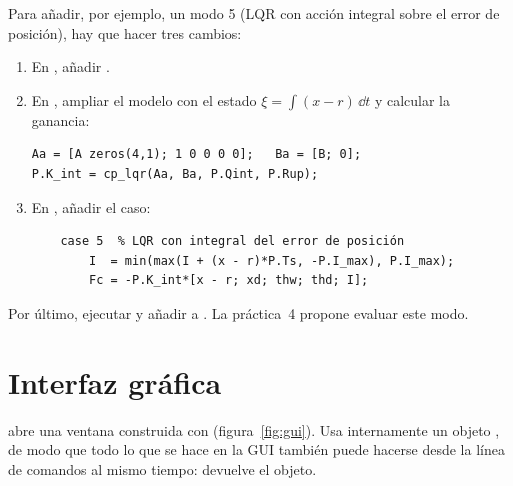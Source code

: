 Para añadir, por ejemplo, un modo 5 (LQR con acción integral sobre el error de posición), hay que hacer tres cambios:
\begin{enumerate}
  \item En , añadir .
  \item En , ampliar el modelo con el estado $\xi=\int(x-r)\,\dd t$ y calcular la ganancia:
\begin{lstlisting}
Aa = [A zeros(4,1); 1 0 0 0 0];   Ba = [B; 0];
P.K_int = cp_lqr(Aa, Ba, P.Qint, P.Rup);
\end{lstlisting}
  \item En , añadir el caso:
\begin{lstlisting}
    case 5  % LQR con integral del error de posición
        I  = min(max(I + (x - r)*P.Ts, -P.I_max), P.I_max);
        Fc = -P.K_int*[x - r; xd; thw; thd; I];
\end{lstlisting}
\end{enumerate}
Por último, ejecutar  y añadir  a . La práctica~4 propone evaluar este modo.

\section{Interfaz gráfica }

 abre una ventana construida con  (figura~\ref{fig:gui}). Usa internamente un objeto , de modo que todo lo que se hace en la GUI también puede hacerse desde la línea de comandos al mismo tiempo:  devuelve el objeto.

